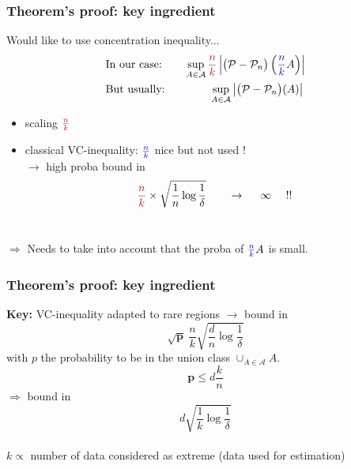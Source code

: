 \documentclass[9pt]{beamer}
\newcommand\red{\color{red} }
\newcommand\blue{\color{blue} }
\def\mb{\mathbf}
\begin{document}
\begin{frame}
\frametitle{Theorem's proof: key ingredient}
Would like to use concentration inequality... %
\begin{align*}
&\text{In our case:~~~~~~} \sup_{A \in \mathcal{A}} {\red\frac{n}{k}}\left| \big(\mathcal{P}- \mathcal{P}_n\big)\left({\blue \frac{n}{k}}A\right)\right|\\
&\text{But usually:~~~~~~~~~~~~} \sup_{A \in \mathcal{A}} \left| \big(\mathcal{P}-\mathcal{P}_n\big)(A) \right|
\end{align*}
\begin{itemize}
\item scaling ${\red \frac{n}{k}}$%
\item classical VC-inequality: ${\blue \frac{n}{k}}$ nice but not used ! \\$\rightarrow $ high proba bound in $${\red \frac{n}{k}} \times  \sqrt{ \frac{1}{ n}\log \frac{1}{\delta}} ~~~~~~\to~~ ~~\infty~~~~ !! $$ \\
\end{itemize}

$\Rightarrow$ Needs to take into account that the proba of  ${\blue \frac{n}{k}}A$ is small.\\
\end{frame}


\begin{frame}
\frametitle{Theorem's proof: key ingredient}
\textbf{Key:}
VC-inequality adapted to rare regions $\rightarrow$ bound in $$\mathbf{\sqrt{p}}~ \frac{n}{k} \sqrt{ \frac{d}{ n}\log \frac{1}{\delta}}$$
with $p$ the probability to be in the union class $\cup_{A \in \mathcal{A}}A$.
$$\mb p \le d \frac{k}{n}$$
$\Rightarrow$ bound in $$ d \sqrt{ \frac{1}{ k}\log \frac{1}{\delta}} $$
~\\
$k \propto$ number of data considered as extreme (data used for estimation)

\end{frame}
\end{document}
